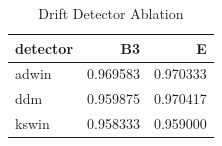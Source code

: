 \begin{table}
\caption{Drift Detector Ablation}
\label{tab:detector_ablation}
\begin{tabular}{lrr}
\toprule
detector & B3 & E \\
\midrule
adwin & 0.969583 & 0.970333 \\
ddm & 0.959875 & 0.970417 \\
kswin & 0.958333 & 0.959000 \\
\bottomrule
\end{tabular}
\end{table}
